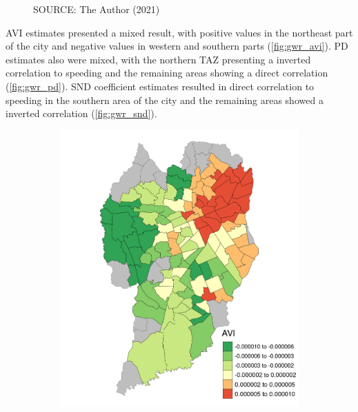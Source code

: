 \begin{figure}[!htbp]
\begin{subfigure}{0.5\textwidth}
    \end{subfigure}    
    \label{fig:gwr_dsc}
    \par SOURCE: The Author (2021)
\end{figure}

AVI estimates presented a mixed result, with positive values in the northeast part of the city and negative values in western and southern parts (\autoref{fig:gwr_avi}). PD estimates also were mixed, with the northern TAZ presenting a inverted correlation to speeding and the remaining areas showing a direct correlation (\autoref{fig:gwr_pd}). SND coefficient estimates resulted in direct correlation to speeding in the southern area of the city and the remaining areas showed a inverted correlation (\autoref{fig:gwr_snd}).

\begin{figure}[!htbp]
    \centering\footnotesize
    \captionsetup{font=footnotesize}
    \caption{AVI COEFFICIENT ESTIMATES}
    \begin{subfigure}{0.5\textwidth}
        \includegraphics{fig/AVI.png}
    \end{subfigure}%
    \begin{subfigure}{0.5\textwidth}

\end{subfigure}
\end{figure}
